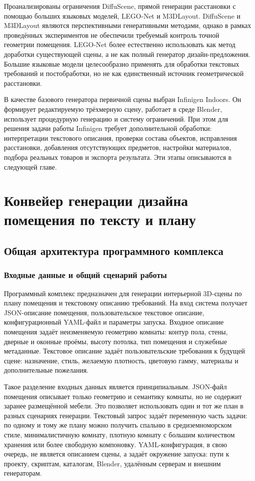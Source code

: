 \documentclass[times]{itmo-student-thesis}
\begin{document}
Проанализированы ограничения DiffuScene, прямой генерации расстановки с помощью больших языковых моделей, LEGO-Net и M3DLayout. DiffuScene и M3DLayout являются перспективными генеративными методами, однако в рамках проведённых экспериментов не обеспечили требуемый контроль точной геометрии помещения. LEGO-Net более естественно использовать как метод доработки существующей сцены, а не как полный генератор дизайн-предложения. Большие языковые модели целесообразно применять для обработки текстовых требований и постобработки, но не как единственный источник геометрической расстановки.

В качестве базового генератора первичной сцены выбран Infinigen Indoors. Он формирует редактируемую трёхмерную сцену, работает в среде Blender, использует процедурную генерацию и систему ограничений. При этом для решения задачи работы Infinigen требует дополнительной обработки: интерпретации текстового описания, проверки состава объектов, исправления расстановки, добавления отсутствующих предметов, настройки материалов, подбора реальных товаров и экспорта результата. Эти этапы описываются в следующей главе.

\chapter{Конвейер генерации дизайна помещения по тексту и плану}

\section{Общая архитектура программного комплекса}

\subsection{Входные данные и общий сценарий работы}

Программный комплекс предназначен для генерации интерьерной 3D-сцены по плану помещения и текстовому описанию требований. На вход система получает JSON-описание помещения, пользовательское текстовое описание, конфигурационный YAML-файл и параметры запуска. Входное описание помещения задаёт неизменяемую геометрию комнаты: контур пола, стены, дверные и оконные проёмы, высоту потолка, тип помещения и служебные метаданные. Текстовое описание задаёт пользовательские требования к будущей сцене: назначение, стиль, желаемую плотность, цветовую гамму, материалы и дополнительные пожелания.

Такое разделение входных данных является принципиальным. JSON-файл помещения описывает только геометрию и семантику комнаты, но не содержит заранее размещённой мебели. Это позволяет использовать один и тот же план в разных сценариях генерации. Текстовый запрос задаёт переменную часть задачи: по одному и тому же плану можно получить спальню в средиземноморском стиле, минималистичную комнату, плотную комнату с большим количеством хранения или более свободную компоновку. YAML-конфигурация, в свою очередь, не является описанием сцены, а задаёт окружение запуска: пути к проекту, скриптам, каталогам, Blender, удалённым серверам и внешним генераторам.
\end{document}
